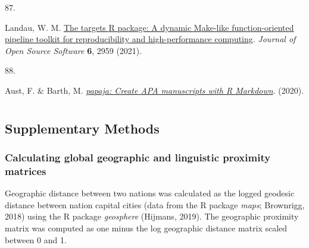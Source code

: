 \documentclass[
  man,floatsintext]{apa6}
\newlength{\cslhangindent}
\newlength{\csllabelwidth}
\newlength{\cslentryspacingunit} %
\newenvironment{CSLReferences}[2] %
 {%
  \setlength{\parindent}{0pt}
  \ifodd #1
  \let\oldpar\par
  \def\par{\hangindent=\cslhangindent\oldpar}
  \fi
  \setlength{\parskip}{#2\cslentryspacingunit}
 }%
 {}
\newcommand{\CSLLeftMargin}[1]{\parbox[t]{\csllabelwidth}{#1}}
\newcommand{\CSLRightInline}[1]{\parbox[t]{\linewidth - \csllabelwidth}{#1}\break}
\begin{document}
\begin{CSLReferences}{0}{0}
\leavevmode{}%
\CSLLeftMargin{87. }%
\CSLRightInline{Landau, W. M. \href{https://doi.org/10.21105/joss.02959}{The targets {R} package: A dynamic {M}ake-like function-oriented pipeline toolkit for reproducibility and high-performance computing}. \emph{Journal of Open Source Software} \textbf{6}, 2959 (2021).}

\leavevmode{}%
\CSLLeftMargin{88. }%
\CSLRightInline{Aust, F. \& Barth, M. \emph{\href{https://github.com/crsh/papaja}{{papaja}: {Create} {APA} manuscripts with {R Markdown}}}. (2020).}

\end{CSLReferences}

\endgroup

\newpage

\hypertarget{appendix-appendix}{%
\appendix}


\renewcommand{\appendixname}{\bf{Supplementary Material}}
\renewcommand{\figurename}{Supplementary Figure}
\renewcommand{\tablename}{Supplementary Table}
\renewcommand{\thefigure}{S\arabic{figure}} \setcounter{figure}{0}
\renewcommand{\thetable}{S\arabic{table}} \setcounter{table}{0}
\renewcommand{\theequation}{S\arabic{table}} \setcounter{equation}{0}

\hypertarget{section}{%
\section{}\label{section}}

\hypertarget{supplementary-methods}{%
\subsection{Supplementary Methods}\label{supplementary-methods}}

\hypertarget{calculating-global-geographic-and-linguistic-proximity-matrices}{%
\subsubsection{Calculating global geographic and linguistic proximity matrices}\label{calculating-global-geographic-and-linguistic-proximity-matrices}}

Geographic distance between two nations was calculated as the logged geodesic distance between nation capital cities (data from the R package \emph{maps}; Brownrigg, 2018) using the R package \emph{geosphere} (Hijmans, 2019). The geographic proximity matrix was computed as one minus the log geographic distance matrix scaled between 0 and 1.
\end{document}
